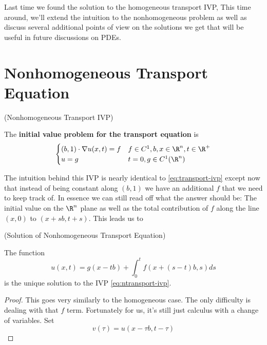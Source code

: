 \documentclass{bkcnotes}
\begin{document}
\maketitle

Last time we found the solution to the homogeneous transport IVP, This
time around, we'll extend the intuition to the nonhomogeneous problem
as well as discuss several additional points of view on the solutions
we get that will be useful in future discussions on PDEs.

\section{Nonhomogeneous Transport Equation}

\begin{ndefn}(Nonhomogeneous Transport IVP)

  The \textbf{initial value problem for the transport equation} is
  \begin{equation}
    \label{eq:ntransport-ivp}
    \begin{cases}
      (b,1) \cdot \nabla u(x,t) = f & f \in C^1, b,x \in \R^n, t \in \R^+ \\
      u = g & t = 0, g \in C^1(\R^n)
    \end{cases}
  \end{equation}
\end{ndefn}
The intuition behind this IVP is nearly identical to
\eqref{eq:transport-ivp} except now that instead of being constant
along $(b,1)$ we have an additional $f$ that we need to keep track
of. In essence we can still read off what the answer should be: The
initial value on the $\R^n$ plane as well as the total contribution of
$f$ along the line $(x,0)$ to $(x+sb,t+s)$. This leads us to

\begin{nthm}(Solution of Nonhomogeneous Transport Equation)

  The function
  \begin{equation}
    \label{eq:ntransport-sol}
    u(x,t) = g(x-tb) + \int_0^t f(x+(s-t)b,s)ds
  \end{equation}
  is the unique solution to the IVP \eqref{eq:ntransport-ivp}.
\end{nthm}
\begin{proof}
  This goes very similarly to the homogeneous case. The only
  difficulty is dealing with that $f$ term. Fortunately for us, it's
  still just calculus with a change of variables. Set
  \begin{equation}
    \label{eq:change-of-var}
    v(\tau) = u(x-\tau b,t-\tau)
  \end{equation}
\end{proof}
\end{document}
